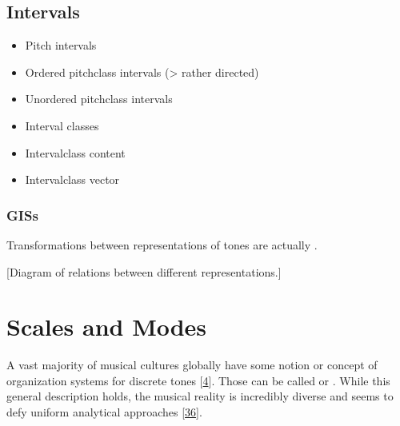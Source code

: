 \documentclass[letterpaper,10pt,english]{sphinxmanual}
\begin{document}
\section{Intervals}
\label{\detokenize{1_fundamentals:intervals}}\label{\detokenize{1_fundamentals:id6}}\begin{itemize}
\item {} 
\sphinxAtStartPar
Pitch intervals

\item {} 
\sphinxAtStartPar
Ordered pitch\sphinxhyphen{}class intervals (\sphinxhyphen{}\textgreater{} rather directed)

\item {} 
\sphinxAtStartPar
Unordered pitch\sphinxhyphen{}class intervals

\item {} 
\sphinxAtStartPar
Interval classes

\item {} 
\sphinxAtStartPar
Interval\sphinxhyphen{}class content

\item {} 
\sphinxAtStartPar
Interval\sphinxhyphen{}class vector

\end{itemize}


\subsection{GISs}
\label{\detokenize{1_fundamentals:giss}}\label{\detokenize{1_fundamentals:sec-gis}}
\sphinxAtStartPar
Transformations between representations of tones are actually .

\sphinxAtStartPar
{[}Diagram of relations between different representations.{]}


\chapter{Scales and Modes}
\label{\detokenize{2_scales_modes:scales-and-modes}}\label{\detokenize{2_scales_modes::doc}}
\sphinxAtStartPar
A vast majority of musical cultures globally have some notion or concept of organization systems
for discrete tones {[}\hyperlink{cite.8_bibliography:id51}{4}{]}. Those can be called  or .
While this general description holds, the musical reality is incredibly diverse and seems to defy
uniform analytical approaches {[}\hyperlink{cite.8_bibliography:id52}{36}{]}.
\end{document}
